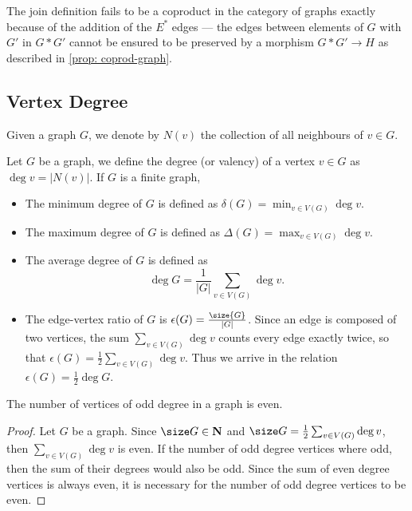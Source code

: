The join definition fails to be a coproduct in the category of graphs exactly
because of the addition of the \(E^*\) edges --- the edges between elements of
\(G\) with \(G'\) in \(G * G'\) cannot be ensured to be preserved by a morphism
\(G * G' \to H\) as described in \cref{prop: coprod-graph}.

\subsection{Vertex Degree}

\begin{notation}[Neighbourhood]
  Given a graph \(G\), we denote by \(N(v)\) the collection of all neighbours of
  \(v \in G\).
\end{notation}

\begin{definition}[Degree]\label{def: degree}
  Let \(G\) be a graph, we define the degree (or valency) of a vertex \(v \in
  G\) as \(\deg v = |N(v)|\). If \(G\) is a finite graph,
  \begin{itemize}
    \setlength\itemsep{0em}
    \item The minimum degree of \(G\) is defined as \(\delta(G) = \min_{v \in
      V(G)} \deg v\).
    \item The maximum degree of \(G\) is defined as \(\Delta(G) = \max_{v \in
      V(G)} \deg v\).
    \item The average degree of \(G\) is defined as
      \[
        \deg G = \frac 1 {|G|} \sum_{v \in V(G)} \deg v.
      \]
    \item The edge-vertex ratio of \(G\) is \(\epsilon(G) =
      \frac{\size{G}}{|G|}\). Since an edge is composed of two vertices, the sum
      \(\sum_{v \in V(G)} \deg v\) counts every edge exactly twice, so that
      \(\epsilon(G) = \frac 1 2 \sum_{v \in V(G)} \deg v\). Thus we arrive in
      the relation \(\epsilon(G) = \frac 1 2 \deg G\).
  \end{itemize}
\end{definition}

\begin{lemma}\label{lem: handshaking}
  The number of vertices of odd degree in a graph is even.
\end{lemma}

\begin{proof}
  Let \(G\) be a graph. Since \(\size G \in \N\) and \(\size G = \frac 1 2
  \sum_{v \in V(G)} \deg v\), then \(\sum_{v \in V(G)} \deg v\) is even. If the
  number of odd degree vertices where odd, then the sum of their degrees would
  also be odd. Since the sum of even degree vertices is always even, it is
  necessary for the number of odd degree vertices to be even.
\end{proof}

